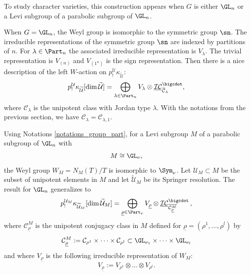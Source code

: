 To study character varieties, this construction appears when $G$ is either $\GL_n$ or a Levi subgroup of a parabolic subgroup of $\GL_n$.
\begin{example}
When $G=\GL_n$, the Weyl group is isomorphic to the symmetric group $\sn$. The irreducible representations of the symmetric group $\sn$ are indexed by partitions of $n$. For $\lambda\in\Part_n$ the associated irreducible representation is $V_\lambda$. The trivial representation is $V_{(n)}$ and $V_{(1^n)}$ is the sign representation. Then there is a nice description of the left $W$-action on $p^{\mathcal{U}}_!\kappa_{\widetilde{\mathcal{U}}}$:
\[
p^{\mathcal{U}}_! \kappa_{\widetilde{\mathcal{U}}}[\dim\widetilde{\mathcal{U}}] =\bigoplus_{\lambda\in \Part_n} V_{\lambda}\otimes\underline{\mathcal{I C}}^{\bigcdot}_{\overline{\mathcal{C}}_{\lambda}},
\]
where $\mathcal{C}_{\lambda}$ is the unipotent class with Jordan type $\lambda$. With the notations from the previous section, we have $\mathcal{C}_{\lambda}=\mathcal{C}_{\lambda,1}$.
\end{example}

\begin{example}
Using Notations \ref{notations_group_part}, for a Levi subgroup $M$ of a parabolic subgroup of $\GL_n$ with
\[
M\cong \GL_{\nu},
\]
the Weyl group $W_M = N_M (T)/T$ is isomorphic to $\Sym_{\nu}$. Let $\mathcal{U}_M\subset M$ be the subset of unipotent elements in $M$ and let $\widetilde{\mathcal{U}}_M$ be its Springer resolution. The result for $\GL_n$ generalizes to
\begin{equation}\label{eq_Springer_NL}
p_!^{\mathcal{U}_M} \kappa_{\widetilde{\mathcal{U}}_M}[\dim \widetilde{\mathcal{U}}_M]=\bigoplus_{\underline{\rho}\in \Part_{\nu}} V_{\underline{\rho}}\otimes \underline{\mathcal{I C}}^{\bigcdot}_{\overline{\mathcal{C}^M_{\underline{\rho}}}}\,,
\end{equation}
where $\mathcal{C}^M_{\underline{\rho}}$ is the unipotent conjugacy class in $M$ defined for $\underline{\rho}=\left(\rho^{1},\dots,\rho^{l}\right)$ by
\[
\mathcal{C}^M_{\underline{\rho}}:=\mathcal{C}_{\rho^{1}}\times\dots\times\mathcal{C}_{\rho^{l}}\subset \GL_{\nu_1}\times\dots\times\GL_{\nu_l}
\]
and where $V_{\underline{\rho}}$ is the following irreducible representation of $W_M$:
\[
V_{\underline{\rho}}:=V_{\rho^1}\otimes\dots\otimes V_{\rho^l}.
\]
\end{example}

